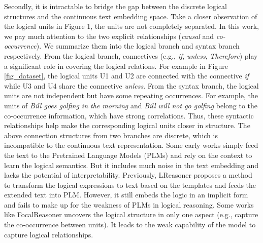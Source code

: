 \documentclass[sigconf]{acmart}
\begin{document}
Secondly, it is intractable to bridge the gap between the discrete logical 
structures and the continuous text embedding space. Take a closer observation 
of the logical units in Figure 1, the units are not completely separated. In 
this work, we pay much attention to the two explicit relationships 
(\textit{causal} and \textit{co-occurrence}). We summarize them into the 
logical branch and syntax branch respectively. From the logical branch, 
connectives (e.g., \textit{if}, \textit{unless}, \textit{Therefore}) play a 
significant role in covering the logical relations. For example in Figure 
\ref{fig_dataset}, the logical units U1 and U2 are connected with the 
connective \textit{if} while U3 and U4 share the connective \textit{unless}. 
From the syntax branch, the logical units are not independent but have some 
repeating occurrences. For example, the units of \textit{Bill goes golfing in 
the morning} and \textit{Bill will not go golfing} belong to the co-occurrence 
information, which have strong correlations. Thus, these syntactic 
relationships help make the corresponding logical units closer in structure. 
The above connection structures from two branches are discrete, which is 
incompatible to the continuous text representation. Some early works simply 
feed the text to the Pretrained Language Models (PLMs) \cite{yang2019xlnet, 
clark2020electra} and rely on the context to learn the logical semantics. But 
it includes much noise in the text embedding and lacks the potential of 
interpretability. Previously, LReasoner \cite{wang2021logic} proposes a method 
to transform the logical expressions to text based on the templates and feeds 
the extended text into PLM. However, it still embeds the logic in an implicit 
form and fails to make up for the weakness of PLMs in logical reasoning. Some 
works like FocalReasoner \cite{ouyang2021fact} uncovers the logical structure 
in only one aspect (e.g., capture the co-occurrence between units). It leads to 
the weak capability of the model to capture logical relationships.
\end{document}

